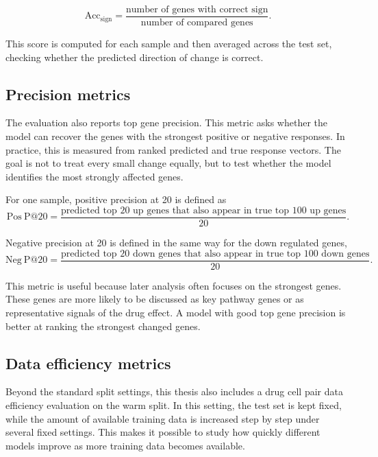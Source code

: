 \begin{equation}
\label{eq:sign_acc}
\mathrm{Acc}_{\mathrm{sign}}=\frac{\text{number of genes with correct sign}}{\text{number of compared genes}}.
\end{equation}

\noindent This score is computed for each sample and then averaged across the test set, checking whether the predicted direction of change is correct.

\subsection{Precision metrics}
The evaluation also reports top gene precision. This metric asks whether the model can recover the genes with the strongest positive or negative responses. In practice, this is measured from ranked predicted and true response vectors. The goal is not to treat every small change equally, but to test whether the model identifies the most strongly affected genes.

\noindent For one sample, positive precision at 20 is defined as
\begin{equation}
\label{eq:pos_p20}
\mathrm{Pos\ P@20}=\frac{\text{predicted top 20 up genes that also appear in true top 100 up genes}}{20}.
\end{equation}

\noindent Negative precision at 20 is defined in the same way for the down regulated genes,
\begin{equation}
\label{eq:neg_p20}
\mathrm{Neg\ P@20}=\frac{\text{predicted top 20 down genes that also appear in true top 100 down genes}}{20}.
\end{equation}

\noindent This metric is useful because later analysis often focuses on the strongest genes. These genes are more likely to be discussed as key pathway genes or as representative signals of the drug effect. A model with good top gene precision is better at ranking the strongest changed genes.

\subsection{Data efficiency metrics}
Beyond the standard split settings, this thesis also includes a drug cell pair data efficiency evaluation on the warm split. In this setting, the test set is kept fixed, while the amount of available training data is increased step by step under several fixed settings. This makes it possible to study how quickly different models improve as more training data becomes available.

